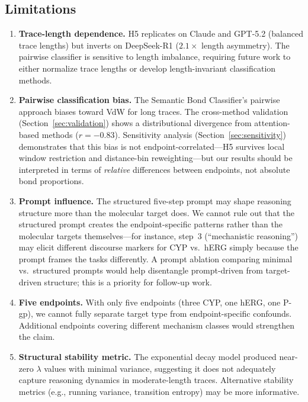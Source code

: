 \documentclass[11pt]{article}
\begin{document}
\subsection{Limitations}

\begin{enumerate}[leftmargin=*]
    \item \textbf{Trace-length dependence.} H5 replicates on Claude and GPT-5.2 (balanced trace lengths) but inverts on DeepSeek-R1 ($2.1\times$ length asymmetry). The pairwise classifier is sensitive to length imbalance, requiring future work to either normalize trace lengths or develop length-invariant classification methods.

    \item \textbf{Pairwise classification bias.} The Semantic Bond Classifier's pairwise approach biases toward VdW for long traces. The cross-method validation (Section~\ref{sec:validation}) shows a distributional divergence from attention-based methods ($r = -0.83$). Sensitivity analysis (Section~\ref{sec:sensitivity}) demonstrates that this bias is not endpoint-correlated---H5 survives local window restriction and distance-bin reweighting---but our results should be interpreted in terms of \emph{relative} differences between endpoints, not absolute bond proportions.

    \item \textbf{Prompt influence.} The structured five-step prompt may shape reasoning structure more than the molecular target does. We cannot rule out that the structured prompt creates the endpoint-specific patterns rather than the molecular targets themselves---for instance, step~3 (``mechanistic reasoning'') may elicit different discourse markers for CYP vs.\ hERG simply because the prompt frames the tasks differently. A prompt ablation comparing minimal vs.\ structured prompts would help disentangle prompt-driven from target-driven structure; this is a priority for follow-up work.

    \item \textbf{Five endpoints.} With only five endpoints (three CYP, one hERG, one P-gp), we cannot fully separate target type from endpoint-specific confounds. Additional endpoints covering different mechanism classes would strengthen the claim.

    \item \textbf{Structural stability metric.} The exponential decay model produced near-zero $\lambda$ values with minimal variance, suggesting it does not adequately capture reasoning dynamics in moderate-length traces. Alternative stability metrics (e.g., running variance, transition entropy) may be more informative.
\end{enumerate}
\end{document}
